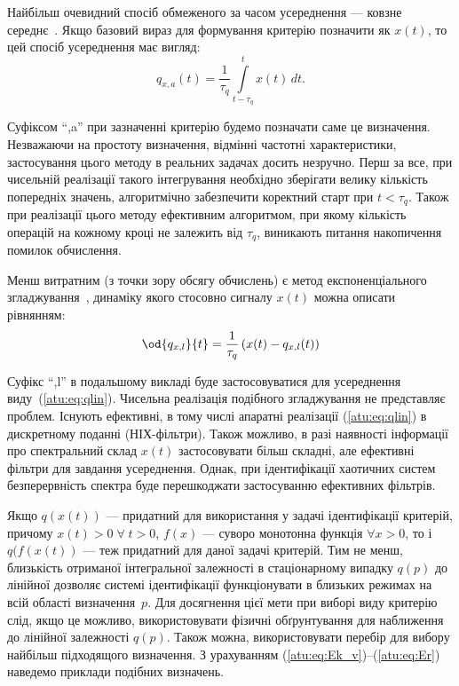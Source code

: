 Найбільш очевидний спосіб обмеженого за часом усереднення ---
ковзне середнє~\cite{greshilov_mat_met_prognoz}.
Якщо базовий вираз для формування критерію позначити як
$x(t)$, то цей спосіб усереднення має вигляд:
%
\begin{equation}
  q_{x,a}(t) =
  \frac{1}{\tau_q}
  \int\limits_{t-\tau_q}^{t} x(t) \, dt.
  \label{atu:eq:moving_avarage}
\end{equation}

Суфіксом ``,a'' при зазначенні критерію будемо позначати саме це
визначення. Незважаючи на простоту визначення, відмінні частотні
характеристики, застосування цього методу в реальних задачах
досить незручно. Перш за все, при чисельній реалізації такого
інтегрування необхідно зберігати велику кількість попередніх
значень, алгоритмічно забезпечити коректний старт при
$ t <  \tau_q $. Також при реалізації цього методу ефективним алгоритмом,
при якому кількість операцій на кожному кроці не залежить від
$ \tau_q $, виникають питання накопичення помилок обчислення.

Менш витратним (з точки зору обсягу обчислень) є метод експоненціального
згладжування~\cite{rastr_stat_meth_search},
динаміку якого стосовно сигналу $x(t)$ можна описати
рівнянням:
%
\begin{equation}
\od{q_{x,l}}{t}
=
\frac{1}{\tau_q} \left( x(t) - q_{x,l}(t) \right)
\label{atu:eq:qlin}
\end{equation}

Суфікс ``,l'' в подальшому викладі буде застосовуватися для
усереднення виду~(\ref{atu:eq:qlin}). Чисельна реалізація подібного
згладжування не представляє проблем. Існують ефективні, в тому
числі апаратні реалізації (\ref{atu:eq:qlin}) в дискретному поданні
(НІХ-фільтри). Також можливо, в разі наявності інформації про
спектральний склад
$x(t)$ застосовувати більш складні, але ефективні фільтри для завдання
усереднення. Однак, при ідентифікації хаотичних систем
безперервність спектра буде перешкоджати застосуванню
ефективних фільтрів.


Якщо
$q(x(t))$ --- придатний для використання у задачі ідентифікації критерій,
причому
$ x (t)> 0 \; \forall \; t> 0 $,
$ f (x) $ --- суворо монотонна функція
$ \forall x > 0 $, то і
$q(f(x(t))$ --- теж придатний для даної задачі критерій. Тим
не менш, близькість отриманої інтегральної залежності в
стаціонарному випадку
$q(p)$ до лінійної дозволяє системі ідентифікації функціонувати
в близьких режимах на всій області визначення~$p$.
Для досягнення цієї мети при виборі виду критерію слід, якщо
це можливо, використовувати фізичні обґрунтування для наближення
до лінійної залежності $q(p)$.
Також можна, використовувати перебір для вибору найбільш
підходящого визначення. З урахуванням (\ref{atu:eq:Ek_v})--(\ref{atu:eq:Er})
наведемо приклади подібних визначень.


